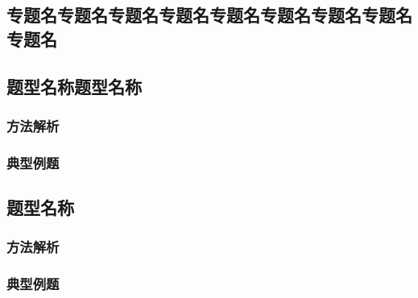 \documentclass[color=orange,openany]{textbook-cn}
\begin{document}
\begin{Topic}
\section{专题名专题名专题名专题名专题名专题名专题名专题名专题名}

\begin{Paracol}
\subsection{题型名称题型名称}

\subsubsection{方法解析}
\lipsum[2]


\subsubsection{典型例题}
\lipsum[2]

\Example{\lipsum[1][1-4]}
\Answer{\lipsum[1][1-4]}
\Answer*{\lipsum[1][1-4]}

\Example{\lipsum[1][1-4]}
\Answer{\lipsum[1][1-4]}
\Answer*{\lipsum[1][1-4]}

\subsection{题型名称}

\subsubsection{方法解析}
\lipsum[1-2]

\subsubsection{典型例题}
\lipsum[2]

\Example{\lipsum[1][1-4]}
\Answer{\lipsum[1][1-4]}
\Answer*{\lipsum[1][1-4]}

\Example{\lipsum[1][1-4]}
\Answer{\lipsum[1][1-4]}
\Answer*{\lipsum[1][1-4]}

\end{Paracol}



\end{Topic}
\end{document}
